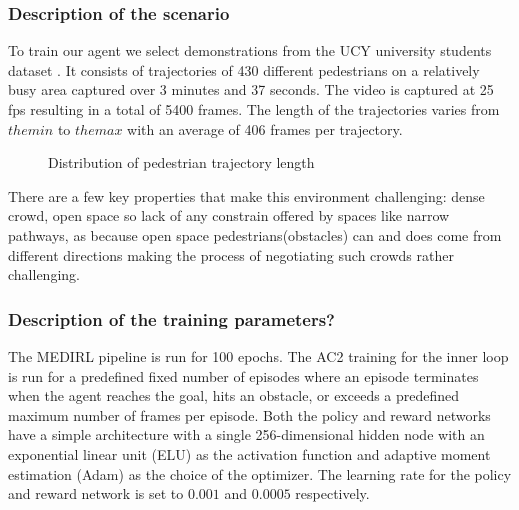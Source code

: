 \subsubsection*{Description of the scenario}
To train our agent we select demonstrations from the UCY university students dataset \cite{ucy-dataset-university-students}. It consists of trajectories of 430 different pedestrians on a relatively busy area captured over 3 minutes and 37 seconds. The video is captured at 25 fps resulting in a total of 5400 frames. The length of the trajectories varies from $the min$  to $the max$ with an average of 406 frames per trajectory. 
\begin{figure}
    \caption {Distribution of pedestrian trajectory length}
\end{figure}
There are a few key properties that make this environment challenging: dense crowd, open space so lack of any constrain offered by spaces like narrow pathways, as because open space pedestrians(obstacles) can and does come from different directions making the process of negotiating such crowds rather challenging. 

%            
\subsubsection*{Description of the training parameters?}

The MEDIRL pipeline is run for 100 epochs. The AC2 \cite{ac2} training for the inner loop is run for a predefined fixed number of episodes where an episode terminates when the agent reaches the goal, hits an obstacle, or exceeds a predefined maximum number of frames per episode. Both the policy and reward networks have a simple architecture with a single 256-dimensional hidden node with an exponential linear unit (ELU) \cite{exponential-linear-unit} as the activation function and adaptive moment estimation (Adam) \cite{adaptive-moment-estimation} as the choice of the optimizer. The learning rate for the policy and reward network is set to $0.001$ and $0.0005$ respectively.


